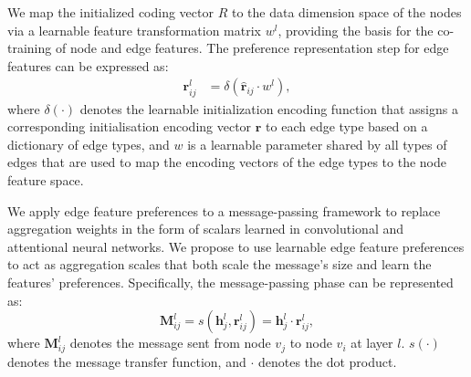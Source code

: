 We map the initialized coding vector $R$ to the data dimension space of the nodes via a learnable feature transformation matrix $w^{l}$, providing the basis for the co-training of node and edge features. 
The preference representation step for edge features can be expressed as:
\begin{align}
    \mathbf{r}_{i j}^l &= \delta(\hat{\mathbf{r}}_{i j} \cdot w^l),
    \label{eq:8}
\end{align}
where $\delta(\cdot)$ denotes the learnable initialization encoding function that assigns a corresponding initialisation encoding vector $\mathbf{r}$ to each edge type based on a dictionary of edge types, and $w$ is a learnable parameter shared by all types of edges that are used to map the encoding vectors of the edge types to the node feature space.

We apply edge feature preferences to a message-passing framework to replace aggregation weights in the form of scalars learned in convolutional and attentional neural networks. 
%
We propose to use learnable edge feature preferences to act as aggregation scales that both scale the message's size and learn the features' preferences. 
%
Specifically, the message-passing phase can be represented as:
\begin{equation}
    \mathbf{M}_{ij}^l = s\left(\mathbf{h}_j^l, \mathbf{r}_{ij}^l\right)=\mathbf{h}_j^l \cdot \mathbf{r}_{ij}^l,
    \label{eq:9}
\end{equation}
where $\mathbf{M}_{ij}^l$ denotes the message sent from node $v_j$ to node $v_i$ at layer $l$. $s(\cdot)$ denotes the message transfer function, and $\cdot$ denotes the dot product.

